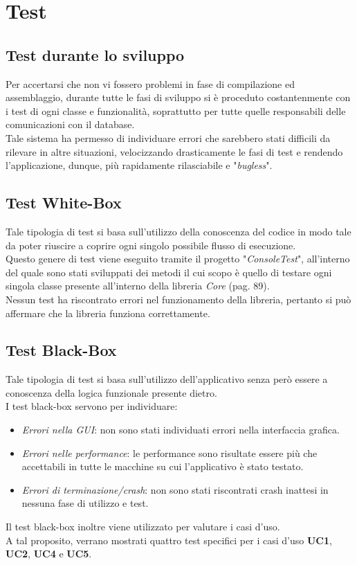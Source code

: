 \documentclass[a4paper,10pt]{report}
\begin{document}
\chapter{Test}
  \section{Test durante lo sviluppo}
		Per accertarsi che non vi fossero problemi in fase di compilazione ed
			assemblaggio, durante tutte le fasi di sviluppo si è proceduto
			costantenmente con i test di ogni classe e funzionalità, soprattutto per
			tutte quelle responsabili delle comunicazioni con il database.\\
			Tale sistema ha permesso di individuare errori che sarebbero stati
			difficili da rilevare in altre situazioni, velocizzando drasticamente
			le fasi di test e rendendo l'applicazione, dunque, più rapidamente
			rilasciabile e "{\itshape bugless}".
  \section{Test White-Box}
		Tale tipologia di test si basa sull'utilizzo della conoscenza del codice in
		 	modo tale da poter riuscire a coprire ogni singolo possibile flusso
			di esecuzione.\\
			Questo genere di test viene eseguito tramite il progetto
			"{\itshape ConsoleTest}", all'interno del quale sono stati sviluppati dei
			metodi il cui scopo è quello di testare ogni singola classe presente
			all'interno della libreria {\itshape Core} (pag. 89).\\
			Nessun test ha riscontrato errori nel funzionamento della libreria,
			pertanto si può affermare che la libreria funziona correttamente.
	\section{Test Black-Box}
		Tale tipologia di test si basa sull'utilizzo dell'applicativo senza però
			essere a conoscenza della logica funzionale presente dietro.\\
			I test black-box servono per individuare:
			\begin{itemize}
				\item \raggedright{\itshape Errori nella GUI}:\newline\hangindent=1cm
					non sono stati individuati errori	nella interfaccia grafica.\par
				\item \raggedright{\itshape Errori nelle performance}:\newline\hangindent=1cm
					le performance sono risultate essere più che accettabili in tutte le
					macchine su cui l'applicativo è stato testato.
				\item \raggedright{\itshape Errori di terminazione/crash}:\newline\hangindent=1cm
					non sono stati riscontrati crash inattesi in nessuna fase di utilizzo e test.
				\end{itemize}
			Il test black-box inoltre viene utilizzato per valutare i casi d'uso.\\
			A tal proposito, verrano mostrati quattro test specifici per i casi
			d'uso \textbf{UC1}, \textbf{UC2}, \textbf{UC4} e \textbf{UC5}.
\end{document}
